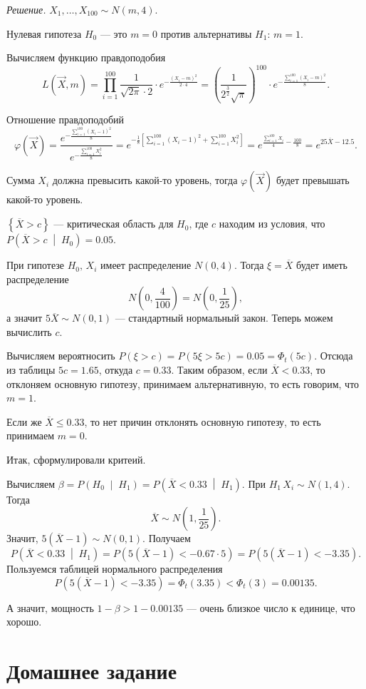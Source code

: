 \textit{Решение.} $X_1, \dotsc, X_{100} \sim N \left( m, 4 \right) $.

Нулевая гипотеза $H_0$ --- это $m = 0$ против альтернативы $H_1: \, m = 1$.

Вычисляем функцию правдоподобия
$$L \left( \vec{X}, m \right) =
  \prod \limits_{i = 1}^{100}
    \frac{1}{ \sqrt{2 \pi } \cdot 2} \cdot e^{- \frac{ \left( X_i - m \right)^2}{2 \cdot 4}} =
  \left( \frac{1}{2^{ \frac{3}{2}} \sqrt{ \pi }} \right)^{100} \cdot
  e^{- \frac{ \sum \limits_{i = 1}^{100} \left( X_i - m \right)^2}{8}}.$$

Отношение правдоподобий
$$ \varphi \left( \vec{X} \right) =
  \frac{e^{- \frac{ \sum \limits_{i = 1}^{100} \left( X_i - 1 \right)^2}{8}}}{e^{- \frac{ \sum \limits_{i = 1}^{100} X_i^2}{8}}} =
  e^{- \frac{1}{8} \left[ \sum \limits_{i = 1}^{100} \left( X_i - 1 \right)^2 + \sum \limits_{i = 1}^{100} X_i^2 \right] } =
  e^{ \frac{ \sum \limits_{i = 1}^{100} X_i}{4} - \frac{100}{8}} =
  e^{25 \overline{X} - 12.5}.$$

Сумма $X_i$ должна превысить какой-то уровень,
тогда $ \varphi \left( \vec{X} \right) $ будет превышать какой-то уровень.

$ \left\{ \overline{X} > c \right\} $ --- критическая область для $H_0$, где $c$ находим из условия,
что $P \left( \overline{X} > c \; \middle| \; H_0 \right) = 0.05$.

При гипотезе $H_0, \, X_i$ имеет распределение $N \left( 0, 4 \right) $.
Тогда $ \xi = \overline{X}$ будет иметь распределение
$$N \left( 0, \frac{4}{100} \right) =
  N \left( 0, \frac{1}{25} \right),$$
а значит $5 \overline{X} \sim N \left( 0, 1 \right) $ --- стандартный нормальный закон.
Теперь можем вычислить $c$.

Вычисляем вероятносить
$P \left( \xi > c \right) =
  P \left( 5 \xi > 5c \right) =
  0.05 =
  \Phi_t \left( 5c \right) $.
Отсюда из таблицы $5c = 1.65$, откуда $c = 0.33$.
Таким образом, если $ \overline{X} < 0.33$, то отклоняем основную гипотезу,
принимаем альтернативную, то есть говорим, что $m = 1$.

Если же $ \overline{X} \leq 0.33$, то нет причин отклонять основную гипотезу,
то есть принимаем $m = 0$.

Итак, сформулировали критеий.

Вычисляем
$ \beta =
  P \left( H_0 \; \middle| \; H_1 \right) =
  P \left( \overline{X} < 0.33 \; \middle| \; H_1 \right) $.
При $H_1 \, X_i \sim N \left( 1, 4 \right) $.
Тогда
$$ \overline{X} \sim
  N \left( 1, \frac{1}{25} \right).$$
Значит, $5 \left( \overline{X} - 1 \right) \sim N \left( 0, 1 \right) $.
Получаем
$$P \left( \overline{X} < 0.33 \; \middle| \; H_1 \right) =
  P \left( 5 \left( \overline{X} - 1 \right) < -0.67 \cdot 5 \right) =
  P \left( 5 \left( \overline{X} - 1 \right) < -3.35 \right).$$
Пользуемся таблицей нормального распределения
$$P \left( 5 \left( \overline{X} - 1 \right) < -3.35 \right) =
  \Phi_t \left( 3.35 \right) <
  \Phi_t \left( 3 \right) =
  0.00135.$$

А значит, мощность $1 - \beta > 1 - 0.00135$ --- очень близкое число к единице, что хорошо.

\section*{Домашнее задание}
